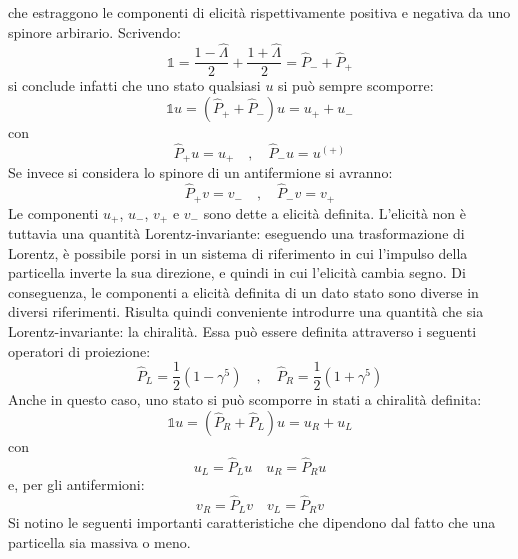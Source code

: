 \documentclass{subnucbo}
\begin{document}
che estraggono le componenti di elicità rispettivamente positiva e negativa da uno spinore arbirario. Scrivendo:
\begin{equation}
        \mathbb{1} = \frac { 1 - \hat{\Lambda } } { 2 } + \frac { 1 + \hat{\Lambda } } { 2 } = \hat{P}_{-} + \hat{P} _ { + }
\end{equation}
si conclude infatti che uno stato qualsiasi $u$ si può sempre scomporre:
\begin{equation}
        \mathbb { 1 } u = \left( \hat{P} _ { + } + \hat{P} _ { - } \right) u = u _ { + } + u _ { - }
\end{equation}
con
\begin{equation}
        \hat { P } _ { + } u = u_{+}\quad ,\quad \hat { P } _ { - } u = u ^ { ( + ) }
\end{equation}
Se invece si considera lo spinore di un antifermione si avranno:
\begin{equation}
        \hat { P } _ { + } v = v_{-} \quad ,\quad \hat { P } _ { - } v = v _ { + }
\end{equation}
Le componenti $u_{+}$, $u_{-}$, $v_{+}$ e $v_{-}$ sono dette a elicità definita.
L'elicità non è tuttavia una quantità Lorentz-invariante: eseguendo una trasformazione di Lorentz, è possibile porsi in un sistema di riferimento in cui l'impulso della particella inverte la sua direzione, e quindi in cui l'elicità cambia segno. Di conseguenza, le componenti a elicità definita di un dato stato sono diverse in diversi riferimenti.
Risulta quindi conveniente introdurre una quantità che sia Lorentz-invariante: la chiralità. Essa può essere definita attraverso i seguenti operatori di proiezione:
\begin{equation}
        \hat{P}_ { L } = \frac { 1 } { 2 } \left( 1 - \gamma ^ { 5 } \right) \quad , \quad \hat{P} _ { R } = \frac { 1 } { 2 } \left( 1 + \gamma ^ { 5 } \right)
        \label{eq:plpr}
\end{equation}
Anche in questo caso, uno stato si può scomporre in stati a chiralità definita:
\begin{equation}
        \mathbb { 1 } u = \left( \hat{P} _ { R } + \hat{P} _ { L } \right) u = u _ { R } + u _ { L }
\end{equation}
con
\begin{equation}
        u _ { L } = \hat{P} _ { L } u \quad u _ { R } = \hat{P} _ { R } u
\end{equation}
e, per gli antifermioni:
\begin{equation}
        v _ { R } = \hat{P} _ { L } v \quad v _ { L } = \hat{P} _ { R } v
\end{equation}
Si notino le seguenti importanti caratteristiche che dipendono dal fatto che una particella sia massiva o meno.
\end{document}
